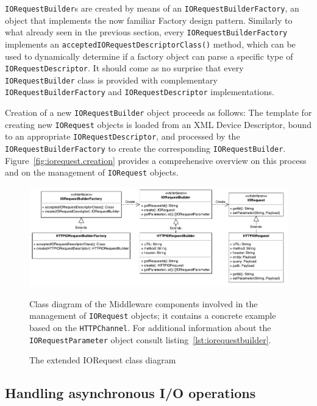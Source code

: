 \texttt{IORequestBuilder}s are created by means of an \texttt{IORequestBuilderFactory}, an object that implements the now familiar Factory design pattern. Similarly to what already seen in the previous section, every \texttt{IORequestBuilderFactory} implements an \texttt{acceptedIORequestDescriptorClass()} method, which can be used to dynamically determine if a factory object can parse a specific type of \texttt{IORequestDescriptor}.   It should come as no surprise that every \texttt{IORequestBuilder} class is provided with complementary \texttt{IORequestBuilderFactory} and \texttt{IORequestDescriptor} implementations.

Creation of a new \texttt{IORequestBuilder} object proceeds as follows: The template for creating new \texttt{IORequest} objects is loaded from an XML Device Descriptor, bound to an appropriate \texttt{IORequestDescriptor}, and processed by the \texttt{IORequestBuilderFactory} to create the corresponding \texttt{IORequestBuilder}. Figure~\ref{fig:iorequest.creation} provides a comprehensive overview on this process and on the management of \texttt{IORequest} objects.

\begin{figure}[!hbt]
\includegraphics[width=\textwidth]{imgs/iorequest.pdf}
\caption{The extended IORequest class diagram}
\label{fig:iorequest.class}
{
\begin{figurenote}
Class diagram of the Middleware components involved in the management of \texttt{IORequest} objects; it contains a concrete example based on the \texttt{HTTPChannel}. For additional information about the \texttt{IORequestParameter} object consult listing~\ref{lst:iorequestbuilder}.
\end{figurenote}
}
\end{figure}


\subsection{Handling asynchronous I/O operations}

